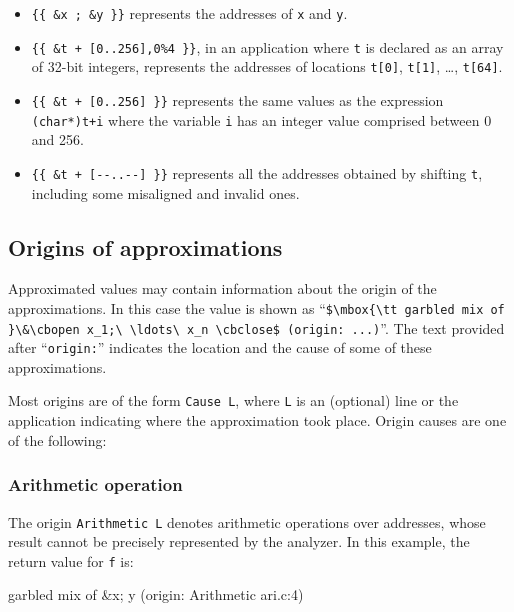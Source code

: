 \documentclass{frama-c-book}
\newcommand{\cbopen}{\mbox{\tt \{}}
\newcommand{\cbclose}{\mbox{\tt \}}}
\begin{document}
\begin{itemize}
\item \lstinline|{{ &x ; &y }}|
      represents the addresses of \lstinline|x| and \lstinline|y|.

\item \lstinline|{{ &t + [0..256],0%4 }}|, in an application where
  \lstinline|t| is declared as an array of 32-bit integers, represents
  the addresses of locations \lstinline|t[0]|, \lstinline|t[1]|, \ldots, \lstinline|t[64]|.

\item \lstinline|{{ &t + [0..256] }}|
represents the same values as the expression \lstinline|(char*)t+i|
where the variable \lstinline|i| has an integer value comprised between 0 and 256.

\item \lstinline|{{ &t + [--..--] }}|
      represents all the addresses obtained by shifting \lstinline|t|, including
some misaligned and invalid ones.

\end{itemize}

\subsection{Origins of approximations}

Approximated values may  contain
information about the origin of the approximations.  In this
case the value is shown as ``\lstinline|$\mbox{\tt garbled mix of }\&\cbopen x_1;\ \ldots\ x_n \cbclose$ (origin: ...)|''.
The text provided after ``\lstinline|origin:|'' indicates the
location and the cause of
some of these approximations.
\goodbreak

Most origins are of the form \lstinline|Cause L|, where \lstinline|L|
is an (optional) line or the application indicating where the approximation
took place. Origin causes are one of the following:

\subsubsection{Arithmetic operation}
The origin \lstinline$Arithmetic L$ denotes arithmetic operations over
addresses, whose result cannot be precisely represented by the analyzer.
In this example, the return value for \lstinline|f| is:

\begin{logs}
{{ garbled mix of &{x; y} (origin: Arithmetic {ari.c:4}) }}
\end{logs}
\end{document}
